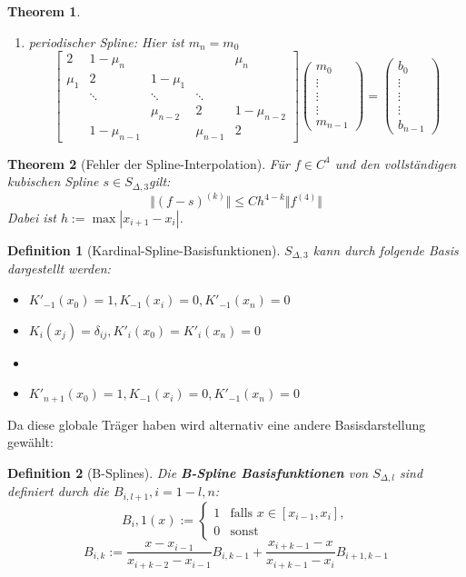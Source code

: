 \documentclass[10pt,a4paper]{article}
\newtheorem{theorem}{Theorem}
\newtheorem{definition}{Definition}
\begin{document}
\begin{theorem}
\begin{enumerate}
$$\begin{pmatrix}
			\vdots \\
			b_{n-1}
		\end{pmatrix}$$
		\item periodischer Spline: Hier ist $m_n = m_0$
		$$\begin{bmatrix}
			2 & 1-\mu_n & & & \mu_n\\
			\mu_1 & 2 & 1-\mu_1 & & \\
			& \ddots& \ddots &\ddots &  \\
			& & \mu_{n-2} & 2 & 1-\mu_{n-2} \\
			&1-\mu_{n-1} & & \mu_{n-1} & 2
		\end{bmatrix} \begin{pmatrix}
			m_0\\
			\vdots\\
			\vdots\\
			\vdots \\
			m_{n-1}
		\end{pmatrix} =  \begin{pmatrix}
			b_0\\
			\vdots\\
			\vdots\\
			\vdots \\
			b_{n-1}
		\end{pmatrix}$$
		\end{enumerate}
	\end{theorem}
	\begin{theorem}[Fehler der Spline-Interpolation]
		Für $f\in C^4$ und den vollständigen kubischen Spline $s\in S_{\Delta, 3}$gilt: $$ \Vert (f-s)^{(k)}\Vert \leq Ch^{4-k} \Vert f^{(4)}\Vert $$
		Dabei ist $h := \max |x_{i+1} -x_i|$.
	\end{theorem}
	\begin{definition}[Kardinal-Spline-Basisfunktionen]
		$S_{\Delta, 3}$ kann durch folgende Basis dargestellt werden:
		\begin{itemize}
			\item $K'_{-1} (x_0)=1, K_{-1}(x_i) = 0, K'_{-1}(x_n) = 0$
			\item $K_i(x_j) = \delta_{ij}, K'_{i}(x_0) = K'_{i}(x_n)= 0$
			\item \item $K'_{n+1} (x_0)=1, K_{-1}(x_i) = 0, K'_{-1}(x_n) = 0$
		\end{itemize}
	\end{definition}
	Da diese globale Träger haben wird alternativ eine andere Basisdarstellung gewählt:
	\begin{definition}[B-Splines]
		Die \textbf{B-Spline Basisfunktionen} von $S_{\Delta, l}$ sind definiert durch die $B_{i, l+1}, i=1-l, n$:
		$$B_i, 1(x) := \begin{cases}
			1 & \text{falls }x \in [x_{i-1}, x_{i}],\\
			0 & \text{sonst} 
		\end{cases}$$
		$$B_{i, k} := \frac{x-x_{i-1}}{x_{i+k-2}-x_{i-1}}B_{i, k-1}+  \frac{x_{i+k-1}-x}{x_{i+k-1}-x_{i}}B_{i+1, k-1}$$
	\end{definition}
\end{document}
